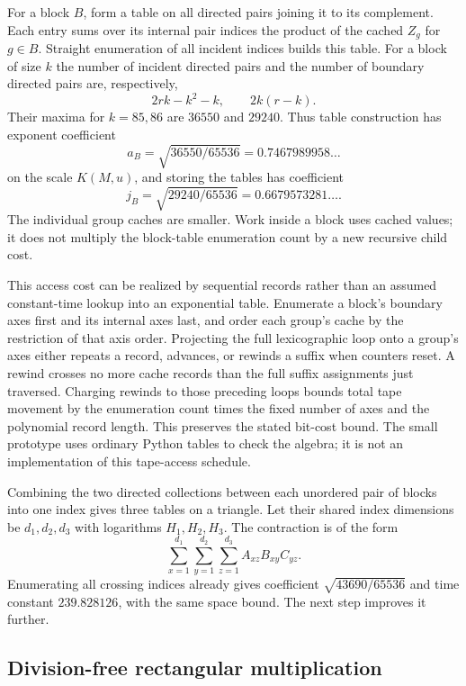 \documentclass[11pt,letterpaper]{article}
\theoremstyle{definition}\newtheorem{definition}[theorem]{Definition}
\theoremstyle{remark}\newtheorem{remark}[theorem]{Remark}
\begin{document}
For a block $B$, form a table on all directed pairs joining it to its
complement. Each entry sums over its internal pair indices the product of
the cached $Z_g$ for $g\in B$. Straight enumeration of all incident indices
builds this table. For a block of size $k$ the number of incident directed
pairs and the number of boundary directed pairs are, respectively,
\[
 2rk-k^2-k,\qquad 2k(r-k).
\]
Their maxima for $k=85,86$ are $36550$ and $29240$.
Thus table construction has exponent coefficient
\[
 a_B=\sqrt{36550/65536}=0.7467989958\ldots
\]
on the scale $K(M,u)$, and storing the tables has coefficient
\[
 j_B=\sqrt{29240/65536}=0.6679573281\ldots.
\]
The individual group caches are smaller. Work inside a block uses cached
values; it does not multiply the block-table enumeration count by a new
recursive child cost.

This access cost can be realized by sequential records rather than an
assumed constant-time lookup into an exponential table. Enumerate a block's
boundary axes first and its internal axes last, and order each group's cache
by the restriction of that axis order. Projecting the full lexicographic loop
onto a group's axes either repeats a record, advances, or rewinds a suffix
when counters reset. A rewind crosses no more cache records than the full
suffix assignments just traversed. Charging rewinds to those preceding loops
bounds total tape movement by the enumeration count times the fixed number
of axes and the polynomial record length. This preserves the stated bit-cost
bound. The small prototype uses ordinary Python tables to check the algebra;
it is not an implementation of this tape-access schedule.

Combining the two directed collections between each unordered pair of blocks
into one index gives three tables on a triangle. Let their shared index
dimensions be $d_1,d_2,d_3$ with logarithms $H_1,H_2,H_3$. The contraction
is of the form
\begin{equation}\label{eq:triangle}
 \sum_{x=1}^{d_1}\sum_{y=1}^{d_2}\sum_{z=1}^{d_3}
       A_{xz}B_{xy}C_{yz}.
\end{equation}
Enumerating all crossing indices already gives coefficient
$\sqrt{43690/65536}$ and time constant $239.828126$, with the same space
bound. The next step improves it further.

\subsection{Division-free rectangular multiplication}
\end{document}

